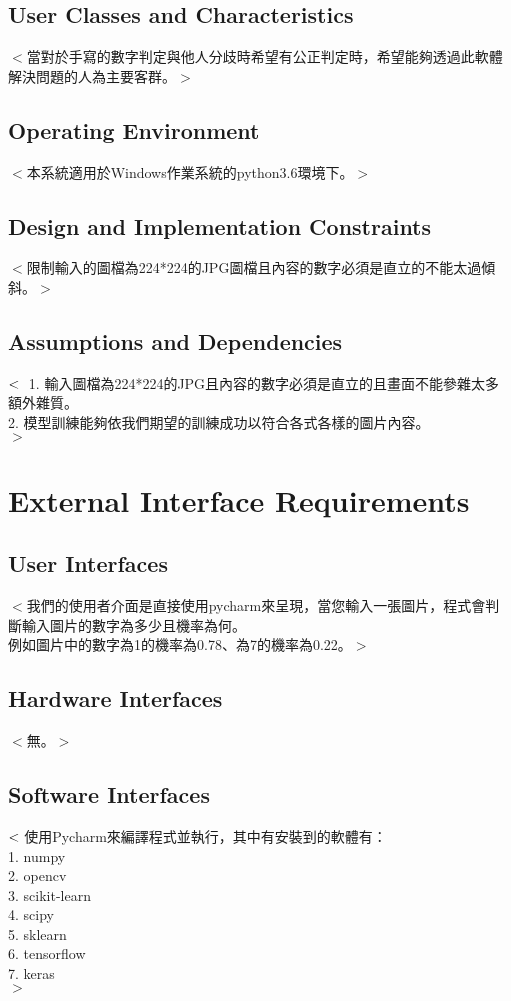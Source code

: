 \documentclass{scrreprt}
\begin{document}
\begin{CJK*}{UTF8}{bsmi}
\section{User Classes and Characteristics}
$<$當對於手寫的數字判定與他人分歧時希望有公正判定時，希望能夠透過此軟體解決問題的人為主要客群。$>$

\section{Operating Environment}
$<$本系統適用於Windows作業系統的python3.6環境下。$>$

\section{Design and Implementation Constraints}
$<$限制輸入的圖檔為224*224的JPG圖檔且內容的數字必須是直立的不能太過傾斜。$>$

\section{Assumptions and Dependencies}
$<\\$
  1. 輸入圖檔為224*224的JPG且內容的數字必須是直立的且畫面不能參雜太多額外雜質。\\
  2. 模型訓練能夠依我們期望的訓練成功以符合各式各樣的圖片內容。\\$>$




\chapter{External Interface Requirements}

\section{User Interfaces}
$<$我們的使用者介面是直接使用pycharm來呈現，當您輸入一張圖片，程式會判斷輸入圖片的數字為多少且機率為何。\\例如圖片中的數字為1的機率為0.78、為7的機率為0.22。$>$

\section{Hardware Interfaces}
$<$無。$>$

\section{Software Interfaces}
$<\\$使用Pycharm來編譯程式並執行，其中有安裝到的軟體有：\\
1.	numpy\\
2.	opencv\\
3.	scikit-learn\\
4.	scipy\\
5.	sklearn\\
6.	tensorflow\\
7.	keras\\$>$



\end{CJK*}
\end{document}
